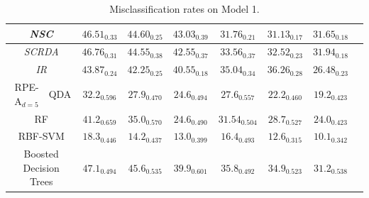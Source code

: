 \documentclass{amsart}
\providecommand{\tabularnewline}{\\}
\begin{document}
\begin{table}[p]
\begin{centering}
\begin{tabular}{r|l|c|c|c|c|c|c|c}
			\hline 
			\multicolumn{2}{c|}{\emph{NSC}} & $\mathit{46.51_{0.33}}$ & $\mathit{44.60_{0.25}}$ & $\mathit{43.03_{0.39}}$ & $\mathit{31.76_{0.21}}$ & $\mathit{31.13_{0.17}}$ & $\mathit{31.65_{0.18}}$ & \tabularnewline
			\hline 
			\multicolumn{2}{c|}{\emph{SCRDA}} & $\mathit{46.76_{0.31}}$ & $\mathit{44.55_{0.38}}$ & $\mathit{42.55_{0.37}}$ & $\mathit{33.56_{0.37}}$ & $\mathit{32.52_{0.23}}$ & $\mathit{31.94_{0.18}}$ & \tabularnewline
			\hline 
			\multicolumn{2}{c|}{\emph{IR}} & $\mathit{43.87_{0.24}}$ & $\mathit{42.25_{0.25}}$ & $\mathit{40.55_{0.18}}$ & $\mathit{35.04_{0.34}}$ & $\mathit{36.26_{0.28}}$ & $\mathit{26.48_{0.23}}$ & \tabularnewline
			\hline 
			\hline 
			RPE-A$_{d=5}$ & QDA & $32.2_{0.596}$ & $27.9_{0.470}$ & $24.6_{0.494}$ & $27.6_{0.557}$ & $22.2_{0.460}$ & $19.2_{0.423}$ & \tabularnewline
			\hline 
			\hline 
			\multicolumn{2}{c|}{RF} & $41.2_{0.659}$ & $35.0_{0.570}$ & $24.6_{0.490}$ & $31.54_{0.504}$ & $28.7_{0.527}$ & $24.0_{0.423}$ & \tabularnewline
			\hline 
			\multicolumn{2}{c|}{RBF-SVM} & $\mathbf{18.3_{0.446}}$ & $\mathbf{14.2_{0.437}}$ & $13.0_{0.399}$ & $\mathbf{16.4_{0.493}}$ & $\mathbf{12.6_{0.315}}$ & $\mathbf{10.1_{0.342}}$ & \tabularnewline
			\hline 
			\multicolumn{2}{c|}{Boosted Decision Trees} & $47.1_{0.494}$ & $45.6_{0.535}$ & $39.9_{0.601}$ & $35.8_{0.492}$ & $34.9_{0.523}$ & $31.2_{0.538}$ & \tabularnewline
		\end{tabular}\\
		
		\par\end{centering}
	
	\protect\caption{Misclassification rates on Model 1.}
	\label{tab:model-1}
\end{table}
\end{document}
